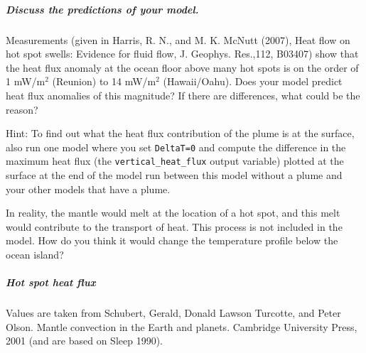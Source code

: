 \subparagraph{Discuss the predictions of your model.}

Measurements (given in Harris, R. N., and M. K. McNutt (2007), Heat flow on hot spot swells: Evidence for fluid flow, J. Geophys. Res.,112, B03407) show that the heat flux anomaly at the ocean floor above many hot spots is on the order of 1 mW/m$^2$ (Reunion) to 14 mW/m$^2$ (Hawaii/Oahu). Does your model predict heat flux anomalies of this magnitude? If there are differences, what could be the reason?

Hint: To find out what the heat flux contribution of the plume is at the surface, also run one model where you set \texttt{DeltaT=0} and compute the difference in the maximum heat flux (the \texttt{vertical\_heat\_flux} output variable) plotted at the surface at the end of the model run between this model without a plume and your other models that have a plume. 

In reality, the mantle would melt at the location of a hot spot, and this melt would contribute to the transport of heat. This process is not included in the model. How do you think it would change the temperature profile below the ocean island?

\subparagraph{Hot spot heat flux}
\label{sec:heat-flux-table}

Values are taken from Schubert, Gerald, Donald Lawson Turcotte, and Peter Olson. Mantle convection in the Earth and planets. Cambridge University Press, 2001 (and are based on Sleep 1990).

